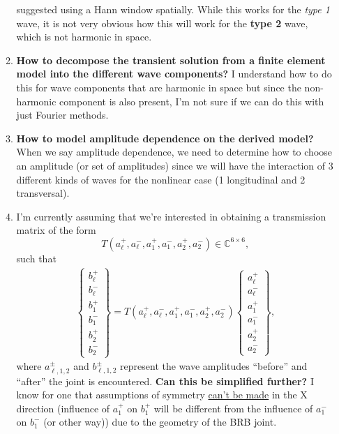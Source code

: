 \documentclass[aspectratio=169]{beamertmd}
\begin{document}
\begin{frame}[allowframebreaks]
\begin{itemize}
\begin{enumerate}
      suggested using a Hann window spatially. While this works for
      the \emph{type 1} wave, it is not very obvious how this will
      work for the \textbf{type 2} wave, which is not harmonic in
      space.
    \item \textbf{How to decompose the transient solution from a
        finite element model into the different wave components?}
      I understand how to do this for wave components that are
      harmonic in space but since the non-harmonic component is also
      present, I'm not sure if we can do this with just Fourier
      methods. 
    \item \textbf{How to model amplitude dependence on the derived
        model?} When we say amplitude dependence, we need to determine
      how to choose an amplitude (or set of amplitudes) since we will
      have the interaction of 3 different kinds of waves for the
      nonlinear case (1 longitudinal and 2 transversal).
    \item I'm currently assuming that we're interested in obtaining a
      transmission matrix of the form
      \vspace{-0.25cm}
      $$ T(a_\ell^+, a_\ell^-, a_1^+, a_1^-, a_2^+, a_2^-) \in
      \mathbb{C}^{6\times 6}, $$
      such that
      \begin{align*}
        \begin{Bmatrix} b^+_\ell\\ b^-_\ell\\ b^+_1\\ b_1^-\\ b^+_2\\
          b_2^- \end{Bmatrix} = T(a_\ell^+, a_\ell^-, a_1^+, a_1^-,
        a_2^+, a_2^-) \begin{Bmatrix} a^+_\ell\\ a^-_\ell\\ a^+_1\\
          a_1^-\\ a^+_2\\ a_2^- \end{Bmatrix},
      \end{align*}
      where $a_{\ell,1,2}^\pm$ and $b_{\ell,1,2}^\pm$ represent the
      wave amplitudes ``before'' and ``after'' the joint is
      encountered. \textbf{Can this be simplified further?} I know for
      one that assumptions of symmetry \underline{can't be made} in
      the X direction (influence of $a_1^+$ on $b_1^+$ will be
      different from the influence of $a_1^-$ on $b_1^-$ (or other
      way)) due to the geometry of the BRB joint.
    \end{enumerate}
  \end{itemize}
\end{frame}
\end{document}
